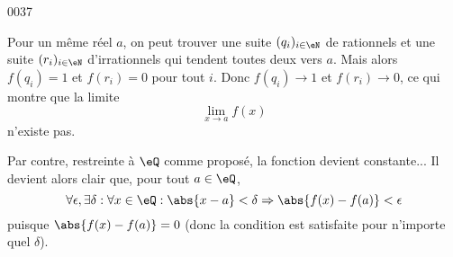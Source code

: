 
\begin{corrige}{0037}

Pour un même réel $a$, on peut trouver une suite $(q_i)_{i\in\eN}$ de rationnels et une suite $(r_i)_{i\in\eN}$ d'irrationnels qui tendent toutes deux vers $a$. Mais alors $f(q_i) = 1$ et $f(r_i) = 0$ pour tout $i$. Donc $f(q_i) \to 1$ et $f(r_i) \to 0$, ce qui montre que la limite
\begin{equation*}
	\lim_{x\to a} f(x)
\end{equation*}
n'existe pas.

Par contre, restreinte à $\eQ$ comme proposé, la fonction devient
constante... Il devient alors clair que, pour tout $a \in \eQ$,
\begin{equation*}
  \forall \epsilon, \exists \delta : \forall x \in \eQ : \abs{x-a} <
  \delta \Rightarrow \abs{f(x) - f(a)} < \epsilon
\end{equation*}
puisque $\abs{f(x) - f(a)} = 0$ (donc la condition est satisfaite pour
n'importe quel $\delta$).


\end{corrige}
